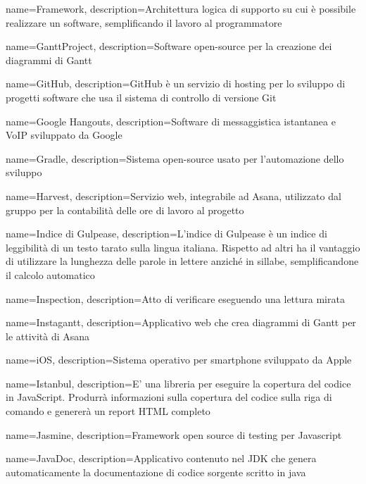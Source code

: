 {
	name={Framework},
	description={Architettura logica di supporto su cui è possibile realizzare un software, semplificando il lavoro al programmatore}
}

{
	name={GanttProject},
	description={Software open-source per la creazione dei diagrammi di Gantt}
}

{
	name={GitHub},
	description={GitHub è un servizio di hosting per lo sviluppo di progetti software che usa il sistema di controllo di versione Git}
}

{
	name={Google Hangouts},
	description={Software di messaggistica istantanea e VoIP sviluppato da Google}
}

{
	name={Gradle},
	description={Sistema open-source usato per l'automazione dello sviluppo}
}

{
	name={Harvest},
	description={Servizio web, integrabile ad Asana, utilizzato dal gruppo per la contabilità delle ore di lavoro al progetto}
}

{
	name={Indice di Gulpease},
	description={L’indice di Gulpease è un indice di leggibilità di un testo tarato sulla lingua
		italiana. Rispetto ad altri ha il vantaggio di utilizzare la lunghezza delle parole in lettere anziché in sillabe, semplificandone il calcolo automatico}
}

{
	name={Inspection},
	description={Atto di verificare eseguendo una lettura mirata}
}

{
	name={Instagantt},
	description={Applicativo web che crea diagrammi di Gantt per le attività di Asana}
}

{
	name={iOS},
	description={Sistema operativo per smartphone sviluppato da Apple}
}

{
	name={Istanbul},
	description={E' una libreria per eseguire la copertura del codice in JavaScript. Produrrà informazioni sulla copertura del codice sulla riga di comando e genererà un report HTML completo}
}

{
	name={Jasmine},
	description={Framework open source di testing per Javascript}
}

{
	name={JavaDoc},
	description={Applicativo contenuto nel JDK che genera automaticamente la documentazione di codice sorgente scritto in java}
}

